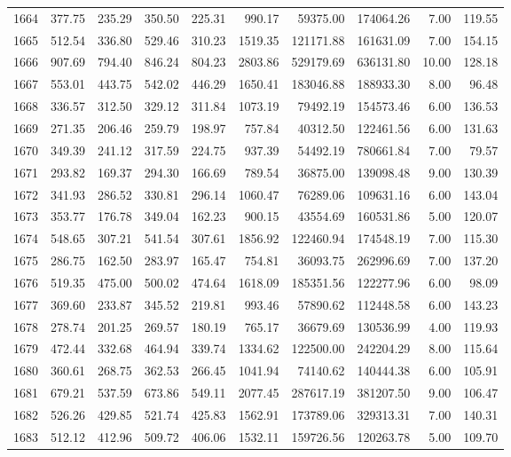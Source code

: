 \begin{tabular}{lrrrrrrrrr}
1664 & 377.75 & 235.29 & 350.50 & 225.31 & 990.17 & 59375.00 & 174064.26 & 7.00 & 119.55 \\
1665 & 512.54 & 336.80 & 529.46 & 310.23 & 1519.35 & 121171.88 & 161631.09 & 7.00 & 154.15 \\
1666 & 907.69 & 794.40 & 846.24 & 804.23 & 2803.86 & 529179.69 & 636131.80 & 10.00 & 128.18 \\
1667 & 553.01 & 443.75 & 542.02 & 446.29 & 1650.41 & 183046.88 & 188933.30 & 8.00 & 96.48 \\
1668 & 336.57 & 312.50 & 329.12 & 311.84 & 1073.19 & 79492.19 & 154573.46 & 6.00 & 136.53 \\
1669 & 271.35 & 206.46 & 259.79 & 198.97 & 757.84 & 40312.50 & 122461.56 & 6.00 & 131.63 \\
1670 & 349.39 & 241.12 & 317.59 & 224.75 & 937.39 & 54492.19 & 780661.84 & 7.00 & 79.57 \\
1671 & 293.82 & 169.37 & 294.30 & 166.69 & 789.54 & 36875.00 & 139098.48 & 9.00 & 130.39 \\
1672 & 341.93 & 286.52 & 330.81 & 296.14 & 1060.47 & 76289.06 & 109631.16 & 6.00 & 143.04 \\
1673 & 353.77 & 176.78 & 349.04 & 162.23 & 900.15 & 43554.69 & 160531.86 & 5.00 & 120.07 \\
1674 & 548.65 & 307.21 & 541.54 & 307.61 & 1856.92 & 122460.94 & 174548.19 & 7.00 & 115.30 \\
1675 & 286.75 & 162.50 & 283.97 & 165.47 & 754.81 & 36093.75 & 262996.69 & 7.00 & 137.20 \\
1676 & 519.35 & 475.00 & 500.02 & 474.64 & 1618.09 & 185351.56 & 122277.96 & 6.00 & 98.09 \\
1677 & 369.60 & 233.87 & 345.52 & 219.81 & 993.46 & 57890.62 & 112448.58 & 6.00 & 143.23 \\
1678 & 278.74 & 201.25 & 269.57 & 180.19 & 765.17 & 36679.69 & 130536.99 & 4.00 & 119.93 \\
1679 & 472.44 & 332.68 & 464.94 & 339.74 & 1334.62 & 122500.00 & 242204.29 & 8.00 & 115.64 \\
1680 & 360.61 & 268.75 & 362.53 & 266.45 & 1041.94 & 74140.62 & 140444.38 & 6.00 & 105.91 \\
1681 & 679.21 & 537.59 & 673.86 & 549.11 & 2077.45 & 287617.19 & 381207.50 & 9.00 & 106.47 \\
1682 & 526.26 & 429.85 & 521.74 & 425.83 & 1562.91 & 173789.06 & 329313.31 & 7.00 & 140.31 \\
1683 & 512.12 & 412.96 & 509.72 & 406.06 & 1532.11 & 159726.56 & 120263.78 & 5.00 & 109.70 \\

\end{tabular}
